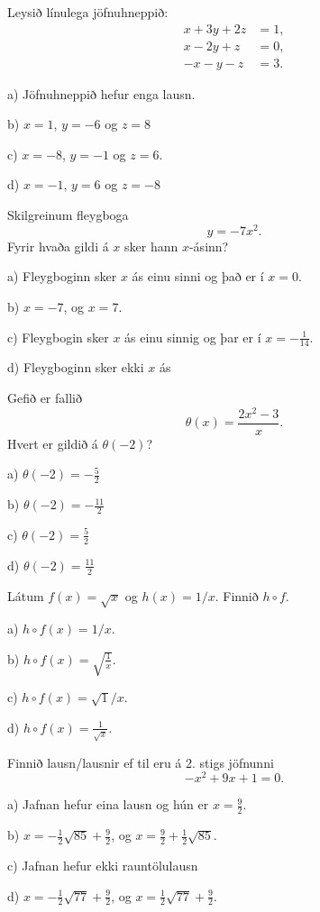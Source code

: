 \item Leysið línulega jöfnuhneppið:
\begin{align*}
x + 3y + 2z &= 1, \\
x - 2y + z &= 0, \\
-x - y - z &= 3.
\end{align*}

a) Jöfnuhneppið hefur enga lausn.

b) $x = 1$, $y = -6$ og $z = 8$

c) $x = -8$, $y = -1$ og $z = 6$. %

d) $x = -1$, $y = 6$ og $z = -8$


\item Skilgreinum fleygboga $$y=- 7 x^{2}.$$ Fyrir hvaða gildi á $x$ sker hann $x$-ásinn?

a) Fleygboginn sker $x$ ás einu sinni og það er í $x=0$. %

b) $x=-7$, og $x=7$.

c) Fleygbogin sker $x$ ás einu sinnig og þar er í $x=- \frac{1}{14}$.

d) Fleygboginn sker ekki $x$ ás


\item Gefið er fallið $$\displaystyle\theta(x)=\frac{2x^2-3}{x}.$$ Hvert er gildið á $\theta(-2)$?

a) $\theta(-2)=-\frac{5}{2}$ %

b) $\theta(-2)=-\frac{11}{2}$

c) $\theta(-2)=\frac{5}{2}$

d) $\theta(-2)=\frac{11}{2}$


\item Látum $f(x)=\sqrt x$ og $h(x)=1/x$. Finnið $h\circ f$.

a) $h \circ f(x) = 1/x$.

b) $h \circ f(x) = \sqrt{\frac 1x}$.

c) $h \circ f(x) = \sqrt{1}/x$.

d) $h\circ f(x) = \frac{1}{\sqrt x}$. %


\item Finnið lausn/lausnir ef til eru á 2. stigs jöfnunni $$- x^{2} + 9 x + 1=0.$$

a) Jafnan hefur eina lausn og hún er $x=\frac{9}{2}$.

b) $x = - \frac{1}{2} \sqrt{85} + \frac{9}{2}$, og $x=\frac{9}{2} + \frac{1}{2} \sqrt{85}$. %

c) Jafnan hefur ekki rauntölulausn

d) $x = - \frac{1}{2} \sqrt{77} + \frac{9}{2}$, og $x=\frac{1}{2} \sqrt{77} + \frac{9}{2}$.


